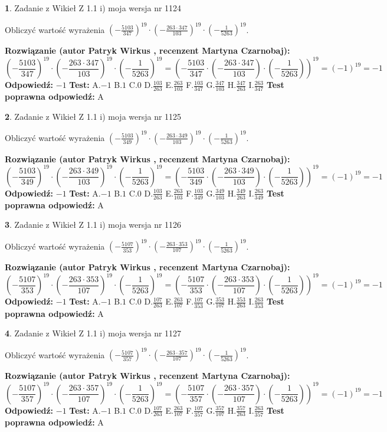 \documentclass[12pt, a4paper]{article}
\theoremstyle{definition} %
\newtheorem{zad}{}
\newcommand{\zadStart}[1]{\begin{zad}#1\newline}
\newcommand{\zadStop}{\end{zad}}
\newcommand{\rozwStart}[2]{\noindent \textbf{Rozwiązanie (autor #1 , recenzent #2): }\newline}
\newcommand{\rozwStop}{\newline}
\newcommand{\odpStart}{\noindent \textbf{Odpowiedź:}\newline}
\newcommand{\odpStop}{\newline}
\newcommand{\testStart}{\noindent \textbf{Test:}\newline}
\newcommand{\testStop}{\newline}
\newcommand{\kluczStart}{\noindent \textbf{Test poprawna odpowiedź:}\newline}
\newcommand{\kluczStop}{\newline}
\begin{document}
\zadStart{Zadanie z Wikieł Z 1.1 i) moja wersja nr 1124}

Obliczyć wartość wyrażenia $(-\frac{5103}{347})^{19} \cdot (-\frac{263 \cdot 347}{103})^{19} \cdot (-\frac{1}{5263})^{19}$.
\zadStop
\rozwStart{Patryk Wirkus}{Martyna Czarnobaj}
$$(-\frac{5103}{347})^{19} \cdot (-\frac{263 \cdot 347}{103})^{19} \cdot (-\frac{1}{5263})^{19} = (-\frac{5103}{347} \cdot (-\frac{263 \cdot 347}{103}) \cdot (-\frac{1}{5263}))^{19} = (-1)^{19} = -1$$
\rozwStop
\odpStart
$-1$
\odpStop
\testStart
A.$-1$ B.$1$ C.$0$ D.$\frac{103}{263}$ E.$\frac{263}{103}$
F.$\frac{103}{347}$ G.$\frac{347}{103}$
H.$\frac{347}{263}$
I.$\frac{263}{347}$
\testStop
\kluczStart
A
\kluczStop



\zadStart{Zadanie z Wikieł Z 1.1 i) moja wersja nr 1125}

Obliczyć wartość wyrażenia $(-\frac{5103}{349})^{19} \cdot (-\frac{263 \cdot 349}{103})^{19} \cdot (-\frac{1}{5263})^{19}$.
\zadStop
\rozwStart{Patryk Wirkus}{Martyna Czarnobaj}
$$(-\frac{5103}{349})^{19} \cdot (-\frac{263 \cdot 349}{103})^{19} \cdot (-\frac{1}{5263})^{19} = (-\frac{5103}{349} \cdot (-\frac{263 \cdot 349}{103}) \cdot (-\frac{1}{5263}))^{19} = (-1)^{19} = -1$$
\rozwStop
\odpStart
$-1$
\odpStop
\testStart
A.$-1$ B.$1$ C.$0$ D.$\frac{103}{263}$ E.$\frac{263}{103}$
F.$\frac{103}{349}$ G.$\frac{349}{103}$
H.$\frac{349}{263}$
I.$\frac{263}{349}$
\testStop
\kluczStart
A
\kluczStop



\zadStart{Zadanie z Wikieł Z 1.1 i) moja wersja nr 1126}

Obliczyć wartość wyrażenia $(-\frac{5107}{353})^{19} \cdot (-\frac{263 \cdot 353}{107})^{19} \cdot (-\frac{1}{5263})^{19}$.
\zadStop
\rozwStart{Patryk Wirkus}{Martyna Czarnobaj}
$$(-\frac{5107}{353})^{19} \cdot (-\frac{263 \cdot 353}{107})^{19} \cdot (-\frac{1}{5263})^{19} = (-\frac{5107}{353} \cdot (-\frac{263 \cdot 353}{107}) \cdot (-\frac{1}{5263}))^{19} = (-1)^{19} = -1$$
\rozwStop
\odpStart
$-1$
\odpStop
\testStart
A.$-1$ B.$1$ C.$0$ D.$\frac{107}{263}$ E.$\frac{263}{107}$
F.$\frac{107}{353}$ G.$\frac{353}{107}$
H.$\frac{353}{263}$
I.$\frac{263}{353}$
\testStop
\kluczStart
A
\kluczStop



\zadStart{Zadanie z Wikieł Z 1.1 i) moja wersja nr 1127}

Obliczyć wartość wyrażenia $(-\frac{5107}{357})^{19} \cdot (-\frac{263 \cdot 357}{107})^{19} \cdot (-\frac{1}{5263})^{19}$.
\zadStop
\rozwStart{Patryk Wirkus}{Martyna Czarnobaj}
$$(-\frac{5107}{357})^{19} \cdot (-\frac{263 \cdot 357}{107})^{19} \cdot (-\frac{1}{5263})^{19} = (-\frac{5107}{357} \cdot (-\frac{263 \cdot 357}{107}) \cdot (-\frac{1}{5263}))^{19} = (-1)^{19} = -1$$
\rozwStop
\odpStart
$-1$
\odpStop
\testStart
A.$-1$ B.$1$ C.$0$ D.$\frac{107}{263}$ E.$\frac{263}{107}$
F.$\frac{107}{357}$ G.$\frac{357}{107}$
H.$\frac{357}{263}$
I.$\frac{263}{357}$
\testStop
\kluczStart
A
\kluczStop
\end{document}
